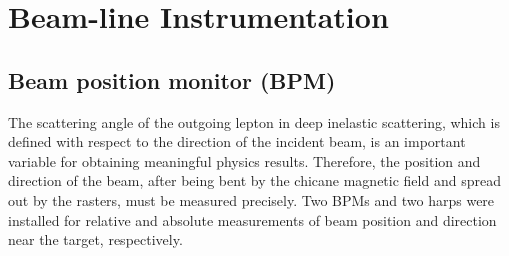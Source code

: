 \documentclass[english,review,number,sort&compress]{elsarticle}
\begin{document}
\section{Beam-line Instrumentation}


\subsection{Beam position monitor (BPM)}

The scattering angle of the outgoing lepton in deep inelastic scattering, which is defined with respect to the direction of the incident beam, is an important variable for obtaining meaningful physics results. Therefore, the position and direction of the beam, after being bent by the chicane magnetic field and spread out by the rasters, must be measured precisely. Two BPMs and two harps were installed for relative and absolute measurements of beam position and direction near the target, respectively.
\end{document}
